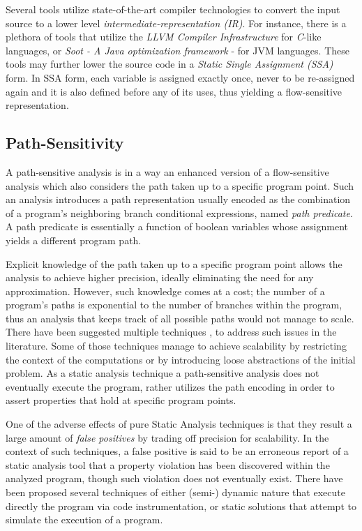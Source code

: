 Several tools utilize state-of-the-art compiler technologies to
convert the input source to a lower level \emph{intermediate-representation (IR)}.
For instance, there is a plethora of tools that utilize the \emph{LLVM Compiler 
Infrastructure}\cite{llvm-lattner} for \emph{C}-like languages,
or \emph{Soot - A Java optimization framework}\cite{soot} - for JVM languages.
These tools may further lower the source code in a
\emph{Static Single Assignment (SSA)} form. In SSA form, each variable is
assigned exactly once, never to be re-assigned again and it is also defined
before any of its uses, thus yielding a flow-sensitive representation.

\subsection{Path-Sensitivity}

A path-sensitive analysis is in a way an enhanced version of a
flow-sensitive analysis which also considers the path taken up to
a specific program point. Such an analysis
introduces a path representation usually encoded as the combination of
a program's neighboring branch conditional expressions,
named \textit{path predicate}. A path predicate is essentially a
function of boolean variables whose assignment yields a
different program path.

Explicit knowledge of the path taken up to a specific
program point allows the analysis to achieve higher
precision, ideally eliminating the need for any approximation.
However, such knowledge comes at a cost; the number of a program's
paths is exponential to the number of branches within the program,
thus an analysis that keeps track of all possible paths would not
manage to scale. There have been suggested multiple techniques
\cite{dillig2008sound}, \cite{das2002esp} to address such issues
in the literature. Some of those techniques manage to achieve
scalability by restricting the context of the computations or
by introducing loose abstractions of the initial problem.
As a static analysis technique a path-sensitive analysis does not
eventually execute the program, rather utilizes
the path encoding in order to assert properties that hold at
specific program points.

One of the adverse effects of pure Static Analysis techniques
is that they result a large amount of \textit{false positives} by
trading off precision for scalability. In the context of
such techniques, a false positive is said to be an erroneous report
of a static analysis tool that a property violation has been
discovered within the analyzed program, though such violation
does not eventually exist. There have been
proposed several techniques of either (semi-) dynamic nature
that execute directly the program via code instrumentation, or
static solutions that attempt to simulate the execution of a program.

